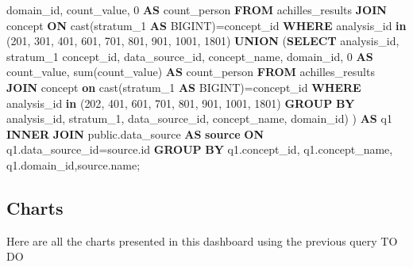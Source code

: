 \documentclass[]{book}
\newenvironment{Shaded}{\begin{snugshade}}{\end{snugshade}}
\newcommand{\KeywordTok}[1]{\textcolor[rgb]{0.13,0.29,0.53}{\textbf{#1}}}
\newcommand{\DecValTok}[1]{\textcolor[rgb]{0.00,0.00,0.81}{#1}}
\newcommand{\FunctionTok}[1]{\textcolor[rgb]{0.00,0.00,0.00}{#1}}
\newcommand{\NormalTok}[1]{#1}
\begin{document}
\begin{Shaded}
\begin{Highlighting}[]
\NormalTok{             domain_id,}
\NormalTok{             count_value, }\DecValTok{0} \KeywordTok{AS}\NormalTok{ count_person}
    \KeywordTok{FROM}\NormalTok{ achilles_results}
    \KeywordTok{JOIN}\NormalTok{ concept }\KeywordTok{ON} \FunctionTok{cast}\NormalTok{(stratum_1 }\KeywordTok{AS}\NormalTok{ BIGINT)=concept_id}
    \KeywordTok{WHERE}\NormalTok{ analysis_id }\KeywordTok{in}\NormalTok{ (}\DecValTok{201}\NormalTok{, }\DecValTok{301}\NormalTok{, }\DecValTok{401}\NormalTok{, }\DecValTok{601}\NormalTok{, }\DecValTok{701}\NormalTok{, }\DecValTok{801}\NormalTok{, }\DecValTok{901}\NormalTok{, }\DecValTok{1001}\NormalTok{, }
        \DecValTok{1801}\NormalTok{)}
    \KeywordTok{UNION}\NormalTok{ (}\KeywordTok{SELECT}\NormalTok{  analysis_id,}
\NormalTok{                   stratum_1 concept_id,}
\NormalTok{                   data_source_id,}
\NormalTok{                   concept_name,}
\NormalTok{                   domain_id,}
                   \DecValTok{0} \KeywordTok{AS}\NormalTok{ count_value,}
                   \FunctionTok{sum}\NormalTok{(count_value) }\KeywordTok{AS}\NormalTok{ count_person}
            \KeywordTok{FROM}\NormalTok{  achilles_results}
            \KeywordTok{JOIN}\NormalTok{ concept }\KeywordTok{on} \FunctionTok{cast}\NormalTok{(stratum_1 }\KeywordTok{AS}\NormalTok{ BIGINT)=concept_id}
            \KeywordTok{WHERE}\NormalTok{ analysis_id }\KeywordTok{in}\NormalTok{ (}\DecValTok{202}\NormalTok{, }\DecValTok{401}\NormalTok{, }\DecValTok{601}\NormalTok{, }\DecValTok{701}\NormalTok{, }\DecValTok{801}\NormalTok{, }\DecValTok{901}\NormalTok{, }
                \DecValTok{1001}\NormalTok{, }\DecValTok{1801}\NormalTok{)}
            \KeywordTok{GROUP} \KeywordTok{BY}\NormalTok{ analysis_id, stratum_1, data_source_id, }
\NormalTok{                concept_name, domain_id) ) }\KeywordTok{AS}\NormalTok{ q1}
    \KeywordTok{INNER} \KeywordTok{JOIN}\NormalTok{ public.data_source }\KeywordTok{AS} \KeywordTok{source} \KeywordTok{ON}\NormalTok{ q1.data_source_id=source.id}
\KeywordTok{GROUP} \KeywordTok{BY}\NormalTok{ q1.concept_id, q1.concept_name, q1.domain_id,source.name;}
\end{Highlighting}
\end{Shaded}

\subsection{Charts}\label{charts}

Here are all the charts presented in this dashboard using the previous
query TO DO
\end{document}
